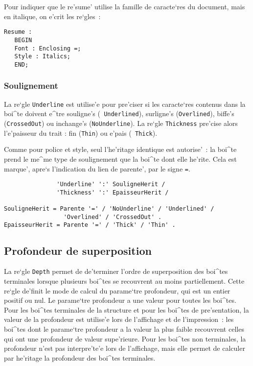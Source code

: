 {\begin{example}
Pour indiquer que le re'sume' utilise la famille de caracte`res du document,
mais en italique, on e'crit les re`gles~:

\begin{verbatim}
Resume :
   BEGIN
   Font : Enclosing =;
   Style : Italics;
   END;
\end{verbatim}
\end{example}

\subsubsection{Soulignement}
\label{underline}

La re`gle {\tt Underline} est utilise'e pour pre'ciser si les
caracte`res contenus dans la boi^te doivent e^tre souligne's ({\tt
Underlined}), surligne's ({\tt Overlined}), biffe's ({\tt CrossedOut})
ou inchange's ({\tt NoUnderline}). La re`gle {\tt Thickness} pre'cise
alors l'e'paisseur du trait : fin ({\tt Thin}) ou e'pais ({\tt
Thick}).

Comme pour police et style, seul l'he'ritage identique est autorise'~:
la boi^te prend le me^me type de soulignement que la boi^te dont elle
he'rite. Cela est marque', apre`s
l'indication du lien de parente', par le signe {\tt =}.

\begin{verbatim}
               'Underline' ':' SouligneHerit /
               'Thickness' ':' EpaisseurHerit /

SouligneHerit = Parente '=' / 'NoUnderline' / 'Underlined' / 
                 'Overlined' / 'CrossedOut' .
EpaisseurHerit = Parente '=' / 'Thick' / 'Thin' .
\end{verbatim}

\subsection{Profondeur de superposition}

La re`gle {\tt Depth} permet de de'terminer l'ordre de superposition des
boi^tes terminales lorsque plusieurs boi^tes se recouvrent au moins
partiellement. Cette re`gle de'finit le mode de calcul du parame`tre
profondeur, qui est un entier positif ou nul. Le parame`tre profondeur a
une valeur pour toutes les boi^tes. Pour les boi^tes terminales de la
structure et pour les boi^tes de pre'sentation, la valeur de la profondeur
est utilise'e lors de l'affichage et de l'impression~: les boi^tes dont le
parame`tre profondeur a la valeur la plus faible recouvrent celles qui ont
une profondeur de valeur supe'rieure. Pour les boi^tes non terminales,
la profondeur n'est pas interpre'te'e lors de l'affichage, mais elle permet
de calculer par he'ritage la profondeur des boi^tes terminales.

}
